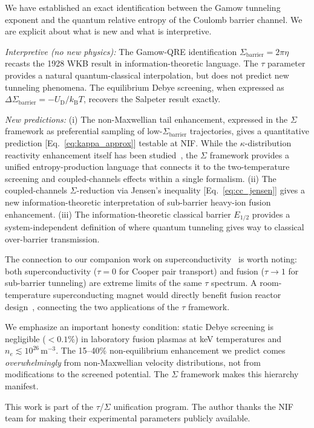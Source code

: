 \documentclass[prc,twocolumn,superscriptaddress,longbibliography,floatfix]{revtex4-2}
\newcommand{\kB}{k_{\mathrm{B}}}
\newcommand{\tauasym}{\tau}
\newcommand{\Sbar}{\Sigma_{\mathrm{barrier}}}
\newcommand{\UD}{U_{\mathrm{D}}}
\begin{document}
We have established an exact identification between the Gamow tunneling
exponent and the quantum relative entropy of the Coulomb barrier channel.
We are explicit about what is new and what is interpretive.

\textit{Interpretive (no new physics):} The Gamow-QRE identification
$\Sbar = 2\pi\eta$ recasts the 1928 WKB result in information-theoretic
language.  The $\tauasym$ parameter provides a natural
quantum-classical interpolation, but does not predict new tunneling
phenomena.  The equilibrium Debye screening, when expressed as
$\Delta\Sbar = -\UD/\kB T$, recovers the Salpeter result exactly.

\textit{New predictions:}
(i) The non-Maxwellian tail enhancement, expressed in the $\Sigma$
framework as preferential sampling of low-$\Sbar$ trajectories, gives
a quantitative prediction [Eq.~\eqref{eq:kappa_approx}] testable at NIF.
While the $\kappa$-distribution reactivity enhancement itself has been
studied~\cite{Du2013,Onofrio2018}, the $\Sigma$ framework provides a
unified entropy-production language that connects it to the
two-temperature screening and coupled-channels effects within a single
formalism.
(ii) The coupled-channels $\Sigma$-reduction via Jensen's inequality
[Eq.~\eqref{eq:cc_jensen}] gives a new information-theoretic
interpretation of sub-barrier heavy-ion fusion enhancement.
(iii) The information-theoretic classical barrier $E_{1/2}$
provides a system-independent definition of where quantum tunneling
gives way to classical over-barrier transmission.

The connection to our companion work on
superconductivity~\cite{HuangSC2026}
is worth noting: both superconductivity ($\tauasym = 0$ for Cooper pair
transport) and fusion ($\tauasym \to 1$ for sub-barrier tunneling) are
extreme limits of the same $\tauasym$ spectrum.  A room-temperature
superconducting magnet would
directly benefit fusion reactor design~\cite{Whyte2016}, connecting the
two applications of the $\tauasym$ framework.

We emphasize an important honesty condition: static Debye screening
is negligible ($< 0.1\%$) in laboratory fusion plasmas at keV
temperatures and $n_{e} \lesssim 10^{26}\,\mathrm{m}^{-3}$.  The
15--40\% non-equilibrium enhancement we predict comes
\emph{overwhelmingly} from non-Maxwellian velocity distributions, not
from modifications to the screened potential.  The $\Sigma$ framework
makes this hierarchy manifest.

\begin{acknowledgments}
This work is part of the $\tauasym$/$\Sigma$ unification program.
The author thanks the NIF team for making their experimental
parameters publicly available.
\end{acknowledgments}
\end{document}
